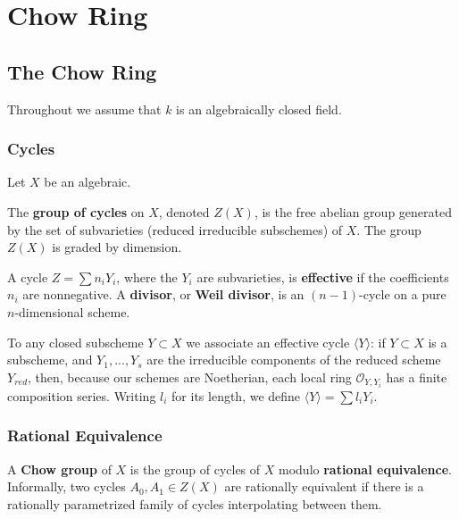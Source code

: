 %
%
%
\chapter{Chow Ring}
\label{chowring} %


\section{The Chow Ring}

Throughout we assume that $k$ is an algebraically closed field.


\subsection{Cycles}

Let $X$ be an algebraic.

\begin{definition}
    The \textbf{group of cycles} on $X$, denoted $Z(X)$, is the free abelian group generated by the set of subvarieties (reduced irreducible subschemes) of $X$. The group $Z(X)$ is graded by dimension.

    A cycle $Z = \sum n_iY_i$, where the $Y_i$ are subvarieties, is \textbf{effective} if the coefficients $n_i$ are nonnegative. A \textbf{divisor}, or \textbf{Weil divisor}, is an $(n-1)$-cycle on a pure $n$-dimensional scheme.
\end{definition}


To any closed subscheme $Y \subset X$ we associate an effective cycle $\langle Y\rangle$: if $Y \subset X$ is a subscheme, and $Y_1,...,Y_s$ are the irreducible components of the reduced scheme $Y_{red}$, then, because our schemes are Noetherian, each local ring $\mathcal{O}_{Y,Y_i}$ has a finite composition series. Writing $l_i$ for its length, we define $\langle Y\rangle = \sum l_iY_i$.


\subsection{Rational Equivalence}

A \textbf{Chow group} of $X$ is the group of cycles of $X$ modulo \textbf{rational equivalence}. Informally, two cycles $A_0,A_1 \in Z(X)$ are rationally equivalent if there is a rationally parametrized family of cycles interpolating between them.

